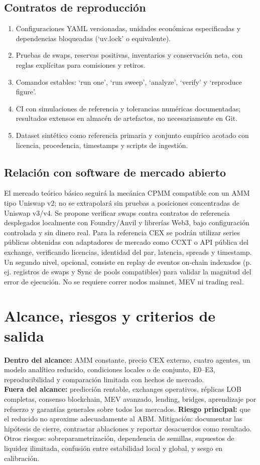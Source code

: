 \documentclass[11pt,a4paper]{article}
\begin{document}
\subsection{Contratos de reproducción}
\begin{enumerate}[leftmargin=*,itemsep=1pt]
\item Configuraciones YAML versionadas, unidades económicas especificadas y dependencias bloqueadas (`uv.lock' o equivalente).
\item Pruebas de swaps, reservas positivas, inventarios y conservación neta, con reglas explícitas para comisiones y retiros.
\item Comandos estables: `run one', `run sweep', `analyze', `verify' y `reproduce figure'.
\item CI con simulaciones de referencia y tolerancias numéricas documentadas; resultados extensos en almacén de artefactos, no necesariamente en Git.
\item Dataset sintético como referencia primaria y conjunto empírico acotado con licencia, procedencia, timestamps y scripts de ingestión.
\end{enumerate}
\subsection{Relación con software de mercado abierto}
El mercado teórico básico seguirá la mecánica CPMM compatible con un AMM tipo Uniswap v2; no se extrapolará sin pruebas a posiciones concentradas de Uniswap v3/v4. Se propone verificar swaps contra contratos de referencia desplegados localmente con Foundry/Anvil y librerías Web3, bajo configuración controlada y sin dinero real. Para la referencia CEX se podrán utilizar series públicas obtenidas con adaptadores de mercado como CCXT o API pública del exchange, verificando licencias, identidad del par, latencia, spreads y timestamp. Un segundo nivel, opcional, consiste en replay de eventos on-chain indexados (p. ej. registros de swaps y Sync de pools compatibles) para validar la magnitud del error de ejecución. No se requiere correr nodos mainnet, MEV ni trading real.
\section{Alcance, riesgos y criterios de salida}
\textbf{Dentro del alcance:} AMM constante, precio CEX externo, cuatro agentes, un modelo analítico reducido, condiciones locales o de conjunto, E0--E3, reproducibilidad y comparación limitada con hechos de mercado.\\
\textbf{Fuera del alcance:} predicción rentable, exchanges operativos, réplicas LOB completas, consenso blockchain, MEV avanzado, lending, bridges, aprendizaje por refuerzo y garantías generales sobre todos los mercados.
\textbf{Riesgo principal:} que el reducido no aproxime adecuadamente al ABM. Mitigación: documentar las hipótesis de cierre, contrastar ablaciones y reportar desacuerdos como resultado. Otros riesgos: sobreparametrización, dependencia de semillas, supuestos de liquidez ilimitada, confusión entre estabilidad local y global, y sesgo en calibración.
\end{document}
